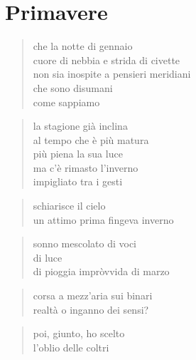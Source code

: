 \chapter*{Primavere}


\begin{verse}
    che la notte di gennaio\\
    cuore di nebbia e strida di civette\\
    non sia inospite a pensieri meridiani\\
    che sono disumani\\
    come sappiamo
\end{verse}

\clearpage


\begin{verse}
    la stagione già inclina\\
    al tempo che è più matura\\
    più piena la sua luce\\
    ma c’è rimasto l’inverno\\
    impigliato tra i gesti
\end{verse}

\clearpage


\begin{verse}
    schiarisce il cielo\\
    un attimo prima fingeva inverno
\end{verse}

\clearpage


\begin{verse}
    sonno mescolato di voci\\
    di luce\\
    di pioggia impròvvida di marzo
\end{verse}

\begin{verse}
    corsa a mezz’aria sui binari\\
    realtà o inganno dei sensi?
\end{verse}

\begin{verse}
    poi, giunto, ho scelto\\
    l’oblio delle coltri
\end{verse}

\clearpage

